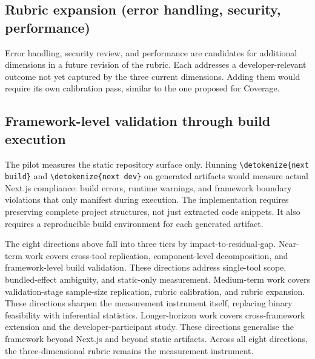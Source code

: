 \documentclass[12pt,a4paper]{report}
\newcommand{\code}[1]{\texttt{\nolinkurl{\detokenize{#1}}}}
\begin{document}
\subsection{Rubric expansion (error handling, security, performance)}

Error handling, security review, and performance are candidates for additional dimensions in a future revision of the rubric. Each addresses a developer-relevant outcome not yet captured by the three current dimensions. Adding them would require its own calibration pass, similar to the one proposed for Coverage.

\subsection{Framework-level validation through build execution}

The pilot measures the static repository surface only. Running \code{next build} and \code{next dev} on generated artifacts would measure actual Next.js compliance: build errors, runtime warnings, and framework boundary violations that only manifest during execution. The implementation requires preserving complete project structures, not just extracted code snippets. It also requires a reproducible build environment for each generated artifact.

The eight directions above fall into three tiers by impact-to-residual-gap. Near-term work covers cross-tool replication, component-level decomposition, and framework-level build validation. These directions address single-tool scope, bundled-effect ambiguity, and static-only measurement. Medium-term work covers validation-stage sample-size replication, rubric calibration, and rubric expansion. These directions sharpen the measurement instrument itself, replacing binary feasibility with inferential statistics. Longer-horizon work covers cross-framework extension and the developer-participant study. These directions generalise the framework beyond Next.js and beyond static artifacts. Across all eight directions, the three-dimensional rubric remains the measurement instrument.

\printbibliography[heading=bibliography, title={Bibliography}]
\end{document}
